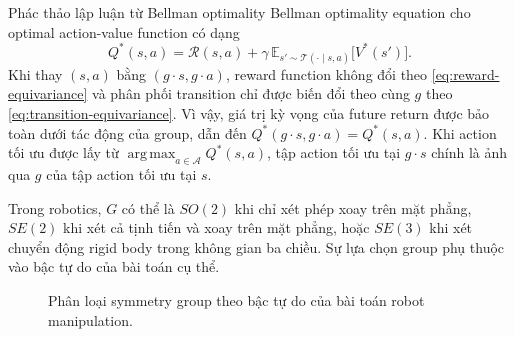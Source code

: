 \begin{NoteBox}{Phác thảo lập luận từ Bellman optimality}
Bellman optimality equation cho optimal action-value function có dạng
\begin{equation}
    Q^*(s,a)
    =
    \mathcal{R}(s,a)
    +
    \gamma\,
    \mathbb{E}_{s' \sim \mathcal{T}(\cdot \mid s,a)}
    \bigl[
        V^*(s')
    \bigr].
    \label{eq:bellman}
\end{equation}
Khi thay $(s,a)$ bằng $(g \cdot s, g \cdot a)$, reward function không đổi theo \eqref{eq:reward-equivariance} và phân phối transition chỉ được biến đổi theo cùng $g$ theo \eqref{eq:transition-equivariance}. Vì vậy, giá trị kỳ vọng của future return được bảo toàn dưới tác động của group, dẫn đến $Q^*(g \cdot s, g \cdot a)=Q^*(s,a)$. Khi action tối ưu được lấy từ $\operatorname*{arg\,max}_{a \in \mathcal{A}} Q^*(s,a)$, tập action tối ưu tại $g \cdot s$ chính là ảnh qua $g$ của tập action tối ưu tại $s$.
\end{NoteBox}


Trong robotics, $G$ có thể là $SO(2)$ khi chỉ xét phép xoay trên mặt phẳng, $SE(2)$ khi xét cả tịnh tiến và xoay trên mặt phẳng, hoặc $SE(3)$ khi xét chuyển động rigid body trong không gian ba chiều. Sự lựa chọn group phụ thuộc vào bậc tự do của bài toán cụ thể.

\begin{figure}[H]
    \centering
    \caption{Phân loại symmetry group theo bậc tự do của bài toán robot manipulation.}
    \label{fig:group-taxonomy}
\end{figure}

